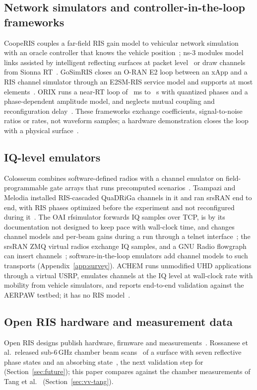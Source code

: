 \subsection{Network simulators and controller-in-the-loop frameworks}
CoopeRIS couples a far-field RIS gain model to vehicular network simulation with an oracle
controller that knows the vehicle position~\cite{Segata2024CoopeRIS}; ns-3 modules model
links assisted by intelligent reflecting surfaces at packet
level~\cite{Pagin2022IRSAF,Grieco2024IoDSimIRS} or draw channels from Sionna
RT~\cite{Zubow2024Ns3Sionna}. GoSimRIS closes an O-RAN E2 loop between an xApp and a RIS
channel simulator through an E2SM-RIS service model and supports at most
\numRepGoSimRisMaxElements{} elements~\cite{ElGhalbzouri2025GoSimRIS}.
ORIX runs a near-RT loop of \numRepOrixLoopMinMs~ms to \numRepOrixLoopMaxS~s with quantized
phases and a phase-dependent
amplitude model, and neglects mutual coupling and reconfiguration delay~\cite{Kayraklik2026ORIX}.
These frameworks exchange coefficients, signal-to-noise ratios or rates, not waveform
samples; a hardware demonstration closes the loop with a physical
surface~\cite{Sahin2025RISmeetsORAN}.

\subsection{IQ-level emulators}
Colosseum combines \numRepColosseumSdrs{} software-defined radios with a channel emulator
on field-programmable gate arrays that runs precomputed
scenarios~\cite{Bonati2021Colosseum,Polese2024ColosseumDT}. Tsampazi and Melodia installed
RIS-cascaded QuaDRiGa channels in it and ran srsRAN end to end, with RIS phases optimized
before the experiment and not reconfigured during
it~\cite{Tsampazi2025RISColosseum,Tsampazi2025ORISing}. The OAI rfsimulator forwards IQ
samples over TCP, is by its documentation not designed to keep pace with wall-clock time, and
changes channel models and per-beam gains during a run through a telnet
interface~\cite{OAIrfsim}; the srsRAN ZMQ virtual radios exchange IQ samples, and a GNU Radio
flowgraph can insert channels~\cite{srsRANZMQ};
software-in-the-loop emulators add channel models to such transports (Appendix~\ref{app:survey}).
ACHEM runs unmodified UHD applications through a virtual USRP,
emulates channels at the IQ level at wall-clock rate with mobility from vehicle simulators,
and reports end-to-end validation against the AERPAW testbed; it has no RIS
model~\cite{Gurses2026ACHEM}.

\subsection{Open RIS hardware and measurement data}
Open RIS designs publish hardware, firmware and
measurements~\cite{OpenRISRepo,Heinrichs2023OpenSourceRIS,Chen2026OpenRIS}. Rossanese et al.\
released sub-6\,GHz chamber beam scans~\cite{Rossanese2024OpenMeas} of a surface with seven
reflective phase states and an absorbing state~\cite{Rossanese2022WiNTECH}, the next
validation step for \sremu{} (Section~\ref{sec:future}); this paper compares against the
chamber measurements of Tang et al.~\cite{Tang2022mmWave} (Section~\ref{sec:vv-tang}).


